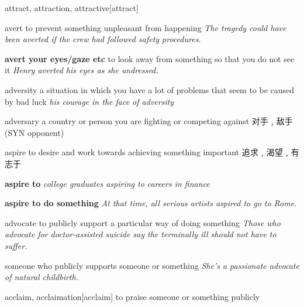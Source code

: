 \begin{DefWord}{attract, attraction, attractive}[attract]
\end{DefWord}

\begin{DefWord}{avert}
    to prevent something unpleasant from happening
    \textit{The tragedy could have been averted if the crew had followed safety procedures.}

    \textbf{avert your eyes/gaze etc} 
    to look away from something so that you do not see it
    \textit{Henry averted his eyes as she undressed.}

\end{DefWord}

\begin{DefWord}{adversity}
    a situation in which you have a lot of problems that seem to be caused by bad luck
    \textit{his courage in the face of adversity}
\end{DefWord}

\begin{DefWord}{adversary}
    a country or person you are fighting or competing against 对手﹐敌手 (SYN opponent)
\end{DefWord}

\begin{DefWord}{aspire}
    to desire and work towards achieving something important
    追求﹐渴望﹐有志于

    \textbf{aspire to}
    \textit{college graduates aspiring to careers in finance}

    \textbf{aspire to do something}
    \textit{At that time, all serious artists aspired to go to Rome.}
\end{DefWord}

\begin{DefWord}{advocate}
    to publicly support a particular way of doing something
    \textit{Those who advocate for doctor-assisted suicide say the terminally ill should not have to suffer.}

    someone who publicly supports someone or something
    \textit{She’s a passionate advocate of natural childbirth.}
\end{DefWord}

\begin{DefWord}{acclaim, acclaimation}[acclaim]
    to praise someone or something publicly
\end{DefWord}